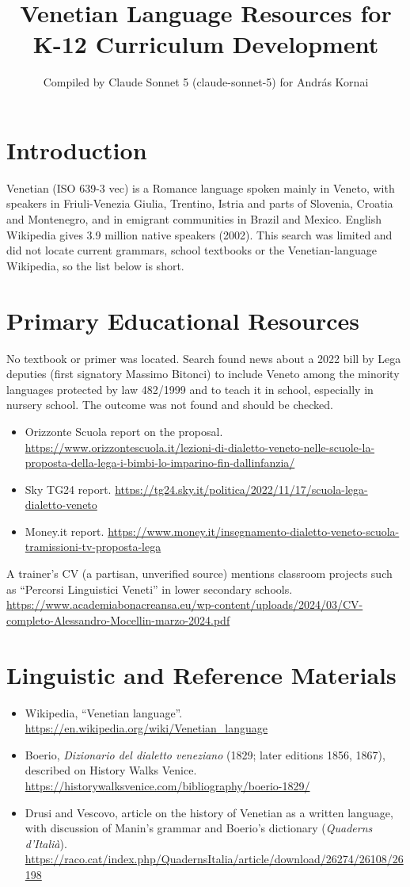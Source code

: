\documentclass[12pt]{article}
\title{Venetian Language Resources for K-12 Curriculum Development}
\author{Compiled by Claude Sonnet 5 (claude-sonnet-5) for Andr\'as Kornai}
\date{}
\begin{document}
\maketitle

\section{Introduction}
Venetian (ISO 639-3 vec) is a Romance language spoken mainly in Veneto, with speakers in Friuli-Venezia Giulia, Trentino, Istria and parts of Slovenia, Croatia and Montenegro, and in emigrant communities in Brazil and Mexico. English Wikipedia gives 3.9 million native speakers (2002). This search was limited and did not locate current grammars, school textbooks or the Venetian-language Wikipedia, so the list below is short.

\section{Primary Educational Resources}
No textbook or primer was located. Search found news about a 2022 bill by Lega deputies (first signatory Massimo Bitonci) to include Veneto among the minority languages protected by law 482/1999 and to teach it in school, especially in nursery school. The outcome was not found and should be checked.
\begin{itemize}
\item Orizzonte Scuola report on the proposal. \url{https://www.orizzontescuola.it/lezioni-di-dialetto-veneto-nelle-scuole-la-proposta-della-lega-i-bimbi-lo-imparino-fin-dallinfanzia/}
\item Sky TG24 report. \url{https://tg24.sky.it/politica/2022/11/17/scuola-lega-dialetto-veneto}
\item Money.it report. \url{https://www.money.it/insegnamento-dialetto-veneto-scuola-tramissioni-tv-proposta-lega}
\end{itemize}
A trainer's CV (a partisan, unverified source) mentions classroom projects such as ``Percorsi Linguistici Veneti'' in lower secondary schools. \url{https://www.academiabonacreansa.eu/wp-content/uploads/2024/03/CV-completo-Alessandro-Mocellin-marzo-2024.pdf}

\section{Linguistic and Reference Materials}
\begin{itemize}
\item Wikipedia, ``Venetian language''. \url{https://en.wikipedia.org/wiki/Venetian_language}
\item Boerio, \emph{Dizionario del dialetto veneziano} (1829; later editions 1856, 1867), described on History Walks Venice. \url{https://historywalksvenice.com/bibliography/boerio-1829/}
\item Drusi and Vescovo, article on the history of Venetian as a written language, with discussion of Manin's grammar and Boerio's dictionary (\emph{Quaderns d'Itali\`a}). \url{https://raco.cat/index.php/QuadernsItalia/article/download/26274/26108/26198}
\end{itemize}
\end{document}
